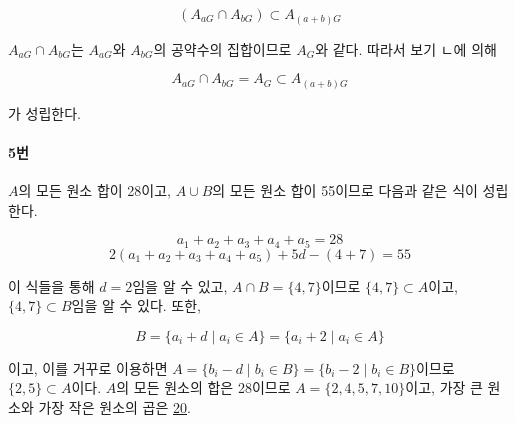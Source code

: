 \documentclass{article}
\begin{document}
\[
    (A_{aG} \cap A_{bG}) \subset A_{(a + b)G}
\]

$A_{aG} \cap A_{bG}$는 $A_{aG}$와 $A_{bG}$의 공약수의 집합이므로 $A_G$와 같다. 따라서 보기 ㄴ에 의해

\[
    A_{aG} \cap A_{bG} = A_G \subset A_{(a + b)G}
\]

가 성립한다.

\paragraph{5번}
$A$의 모든 원소 합이 28이고, $A \cup B$의 모든 원소 합이 55이므로 다음과 같은 식이 성립한다.

\[
    a_1 + a_2 + a_3 + a_4 + a_5 = 28
\]
\[
    2(a_1 + a_2 + a_3 + a_4 + a_5) + 5d - (4 + 7) = 55
\]

이 식들을 통해 $d = 2$임을 알 수 있고, $A \cap B = \{4, 7\}$이므로 $\{4, 7\} \subset A$이고, $\{4, 7\} \subset B$임을 알 수 있다. 또한, 

\[
B = \{a_i + d \mid a_i \in A\} = \{a_i + 2 \mid a_i \in A\}
\]

이고, 이를 거꾸로 이용하면 $A = \{b_i - d \mid b_i \in B\} = \{b_i - 2 \mid b_i \in B\}$이므로 $\{2, 5\} \subset A$이다. $A$의 모든 원소의 합은 28이므로 $A = \{2, 4, 5, 7, 10\}$이고, 가장 큰 원소와 가장 작은 원소의 곱은 \underline{20}.
\end{document}
